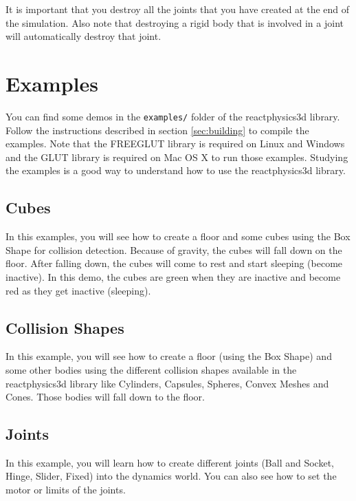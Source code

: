 \documentclass[a4paper,12pt]{article}
\begin{document}
    \vspace{0.6cm}

    It is important that you destroy all the joints that you have created at the end of the simulation. Also note that destroying a
    rigid body that is involved in a joint will automatically destroy that joint.

    \section{Examples}

    You can find some demos in the \texttt{examples/} folder of
    the reactphysics3d library. Follow the instructions described in section \ref{sec:building} to
    compile the examples. Note that the FREEGLUT library is required on Linux and Windows
    and the GLUT library is required on Mac OS X to run those examples. Studying the examples is a
    good way to understand how to use the reactphysics3d library.

    \subsection{Cubes}

    In this examples, you will see how to create a floor and some cubes using the Box Shape for collision detection. Because of gravity,
    the cubes will fall down on the floor. After falling down, the cubes will come to rest and start sleeping (become inactive). In this demo,
    the cubes are green when they are inactive and become red as they get inactive (sleeping).

    \subsection{Collision Shapes}

    In this example, you will see how to create a floor (using the Box Shape) and some other bodies using the different collision shapes available
    in the reactphysics3d library like Cylinders, Capsules, Spheres, Convex Meshes and Cones. Those bodies will fall down to the floor.

    \subsection{Joints}

    In this example, you will learn how to create different joints (Ball and Socket, Hinge, Slider, Fixed) into the dynamics world. You can also see how
    to set the motor or limits of the joints.
\end{document}
